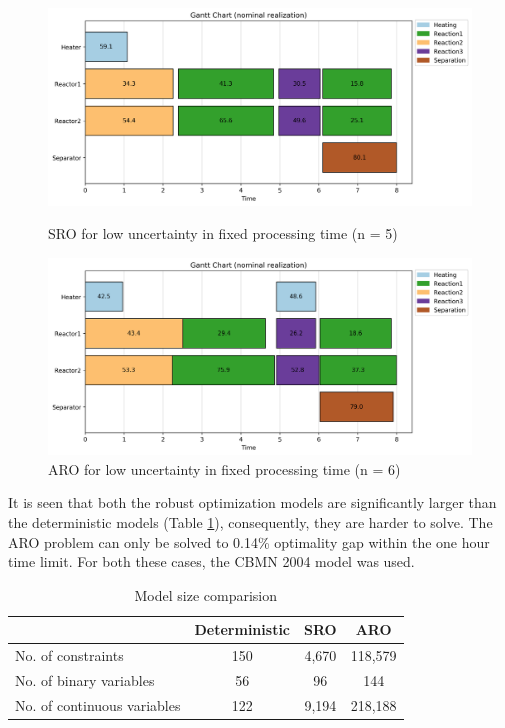 \begin{figure}[htb]
  \centering
  \begin{minipage}[b]{0.49\textwidth}
\includegraphics[width=\textwidth]{Images/SRO_Gantt.png}
    \caption{SRO for low uncertainty in fixed processing time (n = 5)}
\label{fig:GanttSRO}
  \end{minipage}
\hfill
  \begin{minipage}[b]{0.49\textwidth}
\includegraphics[width=\textwidth]{Images/ARO_Gantt.png}
    \caption{ARO for low uncertainty in fixed processing time (n = 6)}
    \label{fig:GanttARO}
  \end{minipage}
\end{figure}


It is seen that both the robust optimization models are significantly larger than the deterministic models (Table \ref{tab:modelsize}), consequently, they are harder to solve. The ARO problem can only be solved to 0.14\% optimality gap within the one hour time limit. For both these cases, the CBMN 2004 model was used.

\begin{table}[htb]
\centering
\caption{Model size comparision}
\label{tab:modelsize}
\begin{tabular}{@{}lccc@{}}
\toprule
                            & \textbf{Deterministic} & \textbf{SRO} & \textbf{ARO} \\ \midrule
No. of constraints          & 150                    & 4,670         & 118,579       \\
No. of binary variables     & 56                     & 96           & 144          \\
No. of continuous variables & 122                    & 9,194         & 218,188       \\ \bottomrule
\end{tabular}
\end{table}

